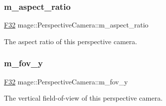 \subsubsection{\texorpdfstring{m\+\_\+aspect\+\_\+ratio}{m\_aspect\_ratio}}
{\footnotesize\ttfamily \hyperlink{namespacemage_aa97e833b45f06d60a0a9c4fc22ae02c0}{F32} mage\+::\+Perspective\+Camera\+::m\+\_\+aspect\+\_\+ratio\hspace{0.3cm}{\ttfamily [private]}}

The aspect ratio of this perspective camera. \hypertarget{classmage_1_1_perspective_camera_aa55ec2c2f069dcdd8bfd0554a2f5011d}{}\label{classmage_1_1_perspective_camera_aa55ec2c2f069dcdd8bfd0554a2f5011d} 
\subsubsection{\texorpdfstring{m\+\_\+fov\+\_\+y}{m\_fov\_y}}
{\footnotesize\ttfamily \hyperlink{namespacemage_aa97e833b45f06d60a0a9c4fc22ae02c0}{F32} mage\+::\+Perspective\+Camera\+::m\+\_\+fov\+\_\+y\hspace{0.3cm}{\ttfamily [private]}}

The vertical field-\/of-\/view of this perspective camera. 
